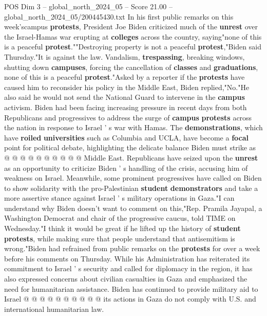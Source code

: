 \begin{textsample}{POS Dim 3 – global\_north\_2024\_05 – Score 21.00 – global\_north\_2024\_05/200445430.txt}  \label{ex:f3_pos_019}
In his first public remarks on this week'scampus \textbf{protests}, President Joe Biden criticized much of the \textbf{unrest} over the Israel-Hamas war erupting at \textbf{colleges} across the country, saying"none of this is a peaceful \textbf{protest}.""Destroying property is not a peaceful \textbf{protest},"Biden said Thursday."It is against the law.
Vandalism, \textbf{trespassing}, breaking windows, shutting down \textbf{campuses}, forcing the cancellation of \textbf{classes} and \textbf{graduations}, none of this is a peaceful \textbf{protest}."Asked by a reporter if the \textbf{protests} have caused him to reconsider his policy in the Middle East, Biden replied,"No."He also said he would not send the National Guard to intervene in the \textbf{campus} activism.
Biden had been facing increasing pressure in recent days from both Republicans and progressives to address the surge of \textbf{campus} \textbf{protests} across the nation in response to Israel ' s war with Hamas.
The \textbf{demonstrations}, which have \textbf{roiled} \textbf{universities} such as Columbia and UCLA, have become a \textbf{focal} point for political debate, highlighting the delicate balance Biden must strike as @ @ @ @ @ @ @ @ @ @ Middle East.
Republicans have seized upon the \textbf{unrest} as an opportunity to criticize Biden ' s handling of the crisis, accusing him of weakness on Israel.
Meanwhile, some prominent progressives have called on Biden to show solidarity with the pro-Palestinian \textbf{student} \textbf{demonstrators} and take a more assertive stance against Israel ' s military operations in Gaza."I can understand why Biden doesn't want to comment on this,"Rep.
Pramila Jayapal, a Washington Democrat and chair of the progressive caucus, told TIME on Wednesday."I think it would be great if he lifted up the history of \textbf{student} \textbf{protests}, while making sure that people understand that antisemitism is wrong."Biden had refrained from public remarks on the \textbf{protests} for over a week before his comments on Thursday.
While his Administration has reiterated its commitment to Israel ' s security and called for diplomacy in the region, it has also expressed concerns about civilian casualties in Gaza and emphasized the need for humanitarian assistance.
Biden has continued to provide military aid to Israel @ @ @ @ @ @ @ @ @ @ its actions in Gaza do not comply with U.S. and international humanitarian law.

\end{textsample}
